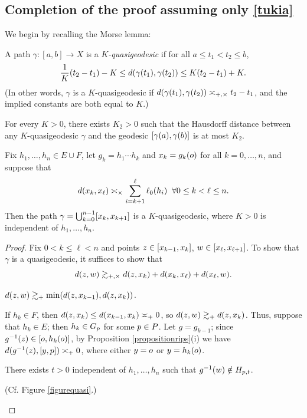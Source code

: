 {\subsection{Completion of the proof assuming only \eqref{tukia}}
We begin by recalling the Morse lemma:

\begin{definition}
\label{definitionquasigeodesic}
A path $\gamma:[a,b]\to X$ is a \emph{$K$-quasigeodesic} if for all $a\leq t_1 < t_2 \leq b$,
\[
\frac1K (t_2 - t_1) - K \leq d(\gamma(t_1),\gamma(t_2)) \leq K(t_2 - t_1) + K.
\]
(In other words, $\gamma$ is a $K$-quasigeodesic if $d(\gamma(t_1),\gamma(t_2)) \asymp_{+,\times} t_2 - t_1$, and the implied constants are both equal to $K$.)
\end{definition}

\begin{lemma}
\label{lemmamorse}
For every $K > 0$, there exists $K_2 > 0$ such that the Hausdorff distance between any $K$-quasigeodesic $\gamma$ and the geodesic $[\gamma(a),\gamma(b)]$ is at most $K_2$.
\end{lemma}

\begin{lemma}
\label{lemmaquasi}
Fix $h_1,\ldots,h_n\in E\cup F$, let $g_k = h_1\cdots h_k$ and $x_k = g_k(o)$ for all $k = 0,\ldots,n$, and suppose that
\begin{equation}
\label{quasi}
d(x_k,x_\ell) \asymp_\times \sum_{i = k + 1}^\ell \ell_0(h_i) \;\;\forall 0\leq k < \ell \leq n.
\end{equation}
Then the path $\gamma = \bigcup_{k = 0}^{n - 1} [x_k,x_{k + 1}]$ is a $K$-quasigeodesic, where $K > 0$ is independent of $h_1,\ldots,h_n$.
\end{lemma}
\begin{proof}
Fix $0 <  k \leq \ell < n$ and points $z\in[x_{k - 1},x_k]$, $w\in[x_\ell,x_{\ell + 1}]$. To show that $\gamma$ is a quasigeodesic, it suffices to show that
\begin{equation}
\label{ETSquasi}
d(z,w) \gtrsim_{+,\times} d(z,x_k) + d(x_k,x_\ell) + d(x_\ell,w).
\end{equation}
\begin{claim}
\label{claimquasi}
$d(z,w)\gtrsim_+ \min(d(z,x_{k - 1}),d(z,x_k))$.
\end{claim}
\begin{subproof}
If $h_k\in F$, then $d(z,x_k) \leq d(x_{k - 1},x_k) \asymp_+ 0$, so $d(z,w)\gtrsim_+ d(z,x_k)$. Thus, suppose that $h_k\in E$; then $h_k\in G_p$ for some $p\in P$. Let $g = g_{k - 1}$; since $g^{-1}(z) \in [o,h_k(o)]$, by Proposition \ref{propositionrips}(i) we have $d(g^{-1}(z),[y,p]) \asymp_+ 0$, where either $y = o$ or $y = h_k(o)$.
\begin{subclaim}
\label{subclaimquasi}
There exists $t > 0$ independent of $h_1,\ldots,h_n$ such that $g^{-1}(w)\notin H_{p,t}$.
\end{subclaim}
(Cf. Figure \ref{figurequasi}.)


\end{subproof}
\end{proof}}
